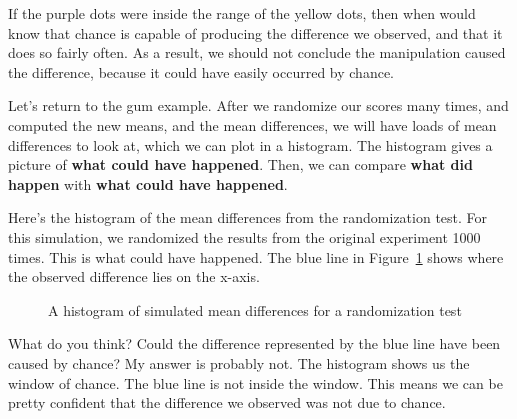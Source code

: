 \documentclass[
  letterpaper,
  DIV=11,
  numbers=noendperiod]{scrreprt}
\begin{document}
If the purple dots were inside the range of the yellow dots, then when
would know that chance is capable of producing the difference we
observed, and that it does so fairly often. As a result, we should not
conclude the manipulation caused the difference, because it could have
easily occurred by chance.

Let's return to the gum example. After we randomize our scores many
times, and computed the new means, and the mean differences, we will
have loads of mean differences to look at, which we can plot in a
histogram. The histogram gives a picture of \textbf{what could have
happened}. Then, we can compare \textbf{what did happen} with
\textbf{what could have happened}.

Here's the histogram of the mean differences from the randomization
test. For this simulation, we randomized the results from the original
experiment 1000 times. This is what could have happened. The blue line
in Figure~\ref{fig-5randhist} shows where the observed difference lies
on the x-axis.

\begin{figure}


\caption{\label{fig-5randhist}A histogram of simulated mean differences
for a randomization test}

\end{figure}%

What do you think? Could the difference represented by the blue line
have been caused by chance? My answer is probably not. The histogram
shows us the window of chance. The blue line is not inside the window.
This means we can be pretty confident that the difference we observed
was not due to chance.
\end{document}

